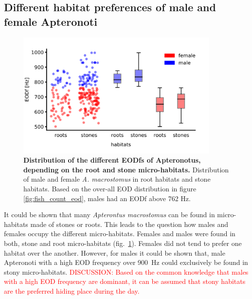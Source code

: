 
\subsection{Different habitat preferences of male and female Apteronoti}

\begin{figure}[H]
    \centering
    \includegraphics[width=0.9\textwidth]{pictures/Results/eod_habitat.png}
    \caption{\textbf{Distribution of the different EODfs of Apteronotus, depending on the root and stone micro-habitats.} Distribution of male and female \textit{A. macrostomus} in root habitats and stone habitats. Based on the over-all EOD distribution in figure \ref{fig:fish_count_eod}, males had an EODf above 762 Hz.}
    \label{fig:habitat_vs_eod}
\end{figure}

It could be shown that many \textit{Apterontus macrostomus} can be found in micro-habitats made of stones or roots. This leads to the question how males and females occupy the different micro-habitats. Females and males were found in both, stone and root micro-habitats (fig.~\ref{fig:habitat_vs_eod}). Females did not tend to prefer one habitat over the another. However, for males it could be shown that, male Apteronoti with a high EOD frequency over 900~Hz could exclusively be found in stony micro-habitats. \textcolor{red}{DISCUSSION: Based on the common knowledge that males with a high EOD frequency are dominant, it can be assumed that stony habitats are the preferred hiding place during the day.}